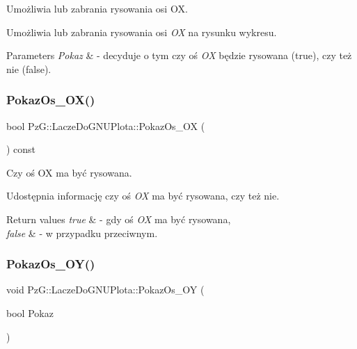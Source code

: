 Umożliwia lub zabrania rysowania osi OX. 

Umożliwia lub zabrania rysowania osi {\itshape OX} na rysunku wykresu. 
\begin{DoxyParams}{Parameters}
{\em Pokaz} & -\/ decyduje o tym czy oś {\itshape OX} będzie rysowana ({\ttfamily true}), czy też nie ({\ttfamily false}). \\
\hline
\end{DoxyParams}
\mbox{\label{classPzG_1_1LaczeDoGNUPlota_ae112972af57167c3b053bf922bce6bbf}} 
\subsubsection{\texorpdfstring{Pokaz\+Os\+\_\+\+O\+X()}{PokazOs\_OX()}\hspace{0.1cm}{\footnotesize\ttfamily [2/2]}}
{\footnotesize\ttfamily bool Pz\+G\+::\+Lacze\+Do\+G\+N\+U\+Plota\+::\+Pokaz\+Os\+\_\+\+OX (\begin{DoxyParamCaption}{ }\end{DoxyParamCaption}) const\hspace{0.3cm}{\ttfamily [inline]}}



Czy oś OX ma być rysowana. 

Udostępnia informację czy oś {\itshape OX} ma być rysowana, czy też nie. 
\begin{DoxyRetVals}{Return values}
{\em true} & -\/ gdy oś {\itshape OX} ma być rysowana, \\
\hline
{\em false} & -\/ w przypadku przeciwnym. \\
\hline
\end{DoxyRetVals}
\mbox{\label{classPzG_1_1LaczeDoGNUPlota_a7c3db909b266fc30808e86406c04b516}} 
\subsubsection{\texorpdfstring{Pokaz\+Os\+\_\+\+O\+Y()}{PokazOs\_OY()}\hspace{0.1cm}{\footnotesize\ttfamily [1/2]}}
{\footnotesize\ttfamily void Pz\+G\+::\+Lacze\+Do\+G\+N\+U\+Plota\+::\+Pokaz\+Os\+\_\+\+OY (\begin{DoxyParamCaption}\item[{bool}]{Pokaz }\end{DoxyParamCaption})\hspace{0.3cm}{\ttfamily [inline]}}



